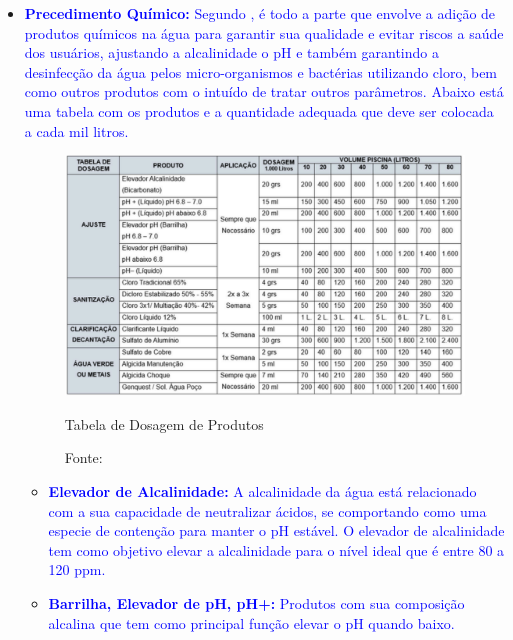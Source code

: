         \begin{itemize}
        
            \item \textbf{\textcolor{blue}{Precedimento Químico:}} \textcolor{blue}{Segundo \cite{guiaTratamento}, é todo a parte que envolve a adição de produtos químicos na água para garantir sua qualidade e evitar riscos a saúde dos usuários, ajustando a alcalinidade o pH e também garantindo a desinfecção da água pelos micro-organismos e bactérias utilizando cloro, bem como outros produtos com o intuído de tratar outros parâmetros. Abaixo está uma tabela com os produtos e a quantidade adequada que deve ser colocada a cada mil litros.}

                \begin{figure}[H]
                    \centering
                    \caption{ }  
                	\centering
                    \label{fig:cont}
                	\includegraphics[width=1.00\textwidth]{imagens/tabelaProdutos.png}
                    \caption*{Tabela de Dosagem de Produtos}
                	\caption*{Fonte: \cite{guiaTratamento}}
                \end{figure}
    
                \begin{itemize}
    
                    \item \textbf{\textcolor{blue}{Elevador de Alcalinidade:}} \textcolor{blue}{A alcalinidade da água está relacionado com a sua capacidade de neutralizar ácidos, se comportando como uma especie de contenção para manter o pH estável. O elevador de alcalinidade tem como objetivo elevar a alcalinidade para o nível ideal que é entre 80 a 120 ppm.}
    
                    \item \textbf{\textcolor{blue}{Barrilha, Elevador de pH, pH+:}} \textcolor{blue}{Produtos com sua composição alcalina que tem como principal função elevar o pH quando baixo.}
    

\end{itemize}
\end{itemize}
